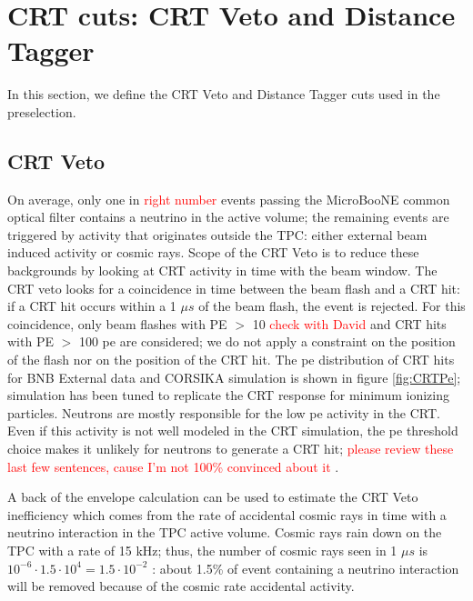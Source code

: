 
\section{CRT cuts: CRT Veto and Distance Tagger}\label{sec:Cuts}
In this section, we define the  CRT Veto and Distance Tagger cuts used in the preselection.
\subsection{CRT Veto}\label{sec:VetoCuts}
On average, only one in \textcolor{red}{right number} events passing the MicroBooNE common optical filter contains a neutrino in the active volume; the remaining events are triggered by activity that originates outside the TPC: either external beam induced activity  or cosmic rays. Scope of the CRT Veto is to reduce these backgrounds by looking at CRT activity in time with the beam window. 
The CRT veto looks for a coincidence in time between the beam flash and a CRT hit: if a CRT hit occurs within a 1 $\mu s$ of the beam flash, the event is rejected. For this coincidence, only beam flashes with PE $>$ 10  \textcolor{red}{check with David} and CRT hits with PE $>$ 100 pe are considered; we do not apply a constraint on the position of the flash nor on the position of the CRT hit. The pe distribution of CRT hits for BNB External data and CORSIKA simulation is shown in figure \ref{fig:CRTPe};  simulation has been tuned to replicate the CRT response for minimum ionizing particles. Neutrons are mostly responsible for the low pe activity in the CRT. Even if this activity is not well modeled in the CRT simulation, the pe threshold choice makes it unlikely for neutrons to generate a CRT hit;   \textcolor{red}{ please review these last few sentences, cause I'm not 100\% convinced about it} . 

A back of the envelope calculation can be used to estimate the CRT Veto inefficiency which comes from the rate of accidental cosmic rays in time with a neutrino interaction in the TPC active volume. Cosmic rays rain down on the TPC with a rate of 15 kHz; thus, the number of cosmic rays seen in 1 $\mu s$ is $10^{-6} \cdot 1.5\cdot10^{4} = 1.5 \cdot10^{-2}$ : about 1.5\% of event containing a neutrino interaction will be removed because of the cosmic rate accidental activity. 
 
